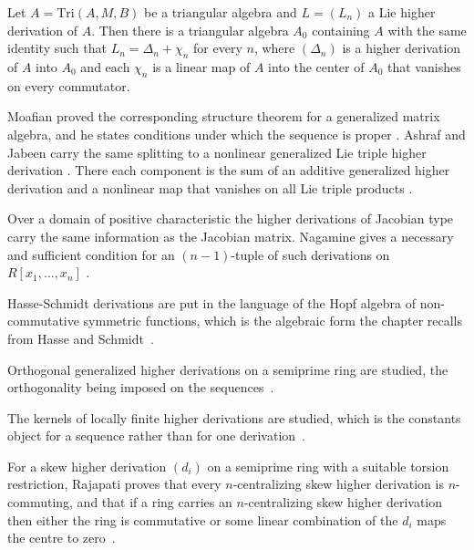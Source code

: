 \begin{theorem}\label{thm:higher:lie-higher-triangular}
Let $A=\mathrm{Tri}(A,M,B)$ be a triangular algebra and $L=(L_{n})$ a Lie higher
derivation of $A$. Then there is a triangular algebra $A_{0}$ containing $A$ with
the same identity such that $L_{n}=\Delta_{n}+\chi_{n}$ for every $n$, where
$(\Delta_{n})$ is a higher derivation of $A$ into $A_{0}$ and each $\chi_{n}$ is a
linear map of $A$ into the center of $A_{0}$ that vanishes on every commutator.
\end{theorem}

Moafian proved the corresponding structure theorem for a generalized matrix
algebra, and he states conditions under which the sequence is proper
\cite[Theorem~4.4, p.~12]{Moafian2017}. Ashraf and Jabeen carry the same splitting
to a nonlinear generalized Lie triple higher derivation
\cite[p.~1]{AshrafJabeen2018}. There each component is the sum of an additive
generalized higher derivation and a nonlinear map that vanishes on all Lie triple
products \cite[Theorem~3.1, p.~5]{AshrafJabeen2018}.

Over a domain of positive characteristic the higher derivations of Jacobian
type carry the same information as the Jacobian matrix. Nagamine gives a
necessary and sufficient condition for an $(n-1)$-tuple of such derivations on
$R[x_1,\dots,x_n]$ \cite[Abstract, p.~1]{Nagamine2019HigherJacobian}.

Hasse-Schmidt derivations are put in the language of the Hopf algebra of non-commutative symmetric functions, which is the algebraic form the chapter recalls from Hasse and Schmidt~\cite{WlHasseSchmidtDerivations2012}.

Orthogonal generalized higher derivations on a semiprime ring are studied, the orthogonality being imposed on the sequences~\cite{WlOrthogonalGeneralizedHigherDer2021}.

The kernels of locally finite higher derivations are studied, which is the constants object for a sequence rather than for one derivation~\cite{WlNotesOnTheKernelsOfLocallyFini2018}.

For a skew higher derivation $(d_i)$ on a semiprime ring with a suitable torsion restriction, Rajapati proves that every $n$-centralizing skew higher derivation is $n$-commuting, and that if a ring carries an $n$-centralizing skew higher derivation then either the ring is commutative or some linear combination of the $d_i$ maps the centre to zero~\cite{WlNCommutingSkewHigherDerivation2020}.

